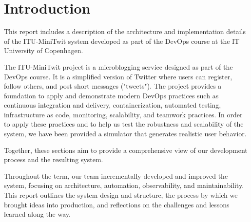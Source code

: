 \section{Introduction}
This report includes a description of the architecture and implementation details of the ITU-MiniTwit system developed as part of the DevOps course at the IT University of Copenhagen. 

The ITU-MiniTwit project is a microblogging service designed as part of the DevOps course. It is a simplified version of Twitter where users can register, follow others, and post short messages ("tweets"). The project provides a foundation to apply and demonstrate modern DevOps practices such as continuous integration and delivery, containerization, automated testing, infrastructure as code, monitoring, scalability, and teamwork practices. In order to apply these practices and to help us test the robustness and scalability of the system, we have been provided a simulator that generates realistic user behavior.

Together, these sections aim to provide a comprehensive view of our development process and the resulting system.

Throughout the term, our team incrementally developed and improved the system, focusing on architecture, automation, observability, and maintainability. This report outlines the system design and structure, the process by which we brought ideas into production, and reflections on the challenges and lessons learned along the way.

